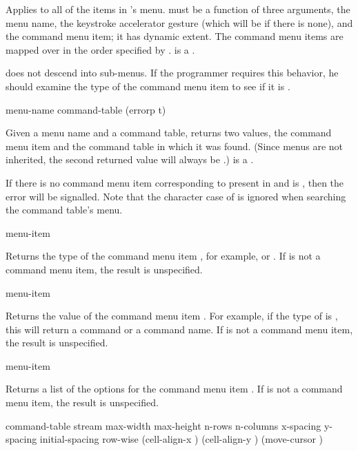 Applies  to all of the items in 's menu.
 must be a function of three arguments, the menu name, the
keystroke accelerator gesture (which will be  if there is none), and the
command menu item; it has dynamic extent.  The command menu items are mapped
over in the order specified by .
 is a .

 does not descend into sub-menus.  If the
programmer requires this behavior, he should examine the type of the command
menu item to see if it is .


 {menu-name command-table \key (errorp t)}

Given a menu name and a command table, returns two values, the command menu item
and the command table in which it was found.  (Since menus are not inherited,
the second returned value will always be .)
 is a .
\ReadOnly

If there is no command menu item corresponding to  present in
 and  is , then the
 error will be signalled.  Note that the character
case of  is ignored when searching the command table's menu.


 {menu-item}

Returns the type of the command menu item , for example,
 or .  If  is not a command menu item, the
result is unspecified.

 {menu-item}

Returns the value of the command menu item .  For example, if the
type of  is , this will return a command or a
command name.  If  is not a command menu item, the result is
unspecified.

 {menu-item}

Returns a list of the options for the command menu item .  If
 is not a command menu item, the result is unspecified.


 {command-table stream
                                          \key max-width max-height n-rows n-columns
                                               x-spacing y-spacing initial-spacing row-wise
                                               (cell-align-x ) (cell-align-y )
                                               (move-cursor )}

